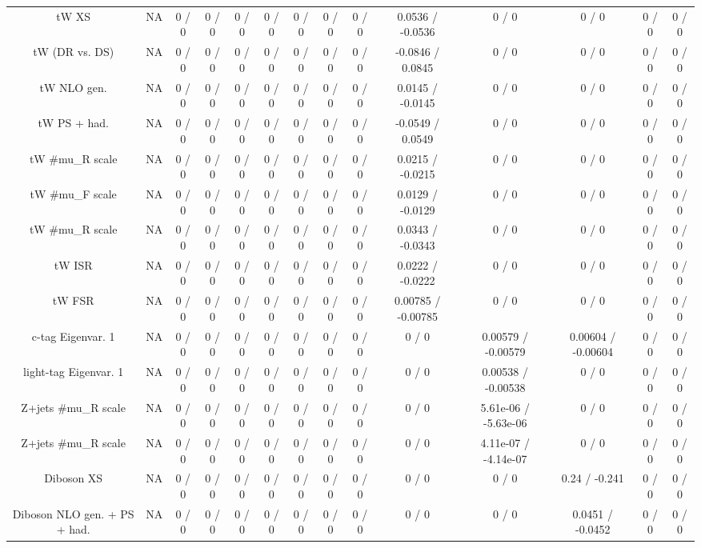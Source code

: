 \documentclass[10pt]{article}
\begin{document}
\begin{table}[htbp]
\begin{center}
\begin{tabular}{|c|c|c|c|c|c|c|c|c|c|c|c|c|c|}
  tW XS &    NA    & 0 / 0 & 0 / 0 & 0 / 0 & 0 / 0 & 0 / 0 & 0 / 0 & 0 / 0 & 0.0536 / -0.0536 & 0 / 0 & 0 / 0 & 0 / 0 & 0 / 0 \\ 
  tW (DR vs. DS) &    NA    & 0 / 0 & 0 / 0 & 0 / 0 & 0 / 0 & 0 / 0 & 0 / 0 & 0 / 0 & -0.0846 / 0.0845 & 0 / 0 & 0 / 0 & 0 / 0 & 0 / 0 \\ 
  tW NLO gen. &    NA    & 0 / 0 & 0 / 0 & 0 / 0 & 0 / 0 & 0 / 0 & 0 / 0 & 0 / 0 & 0.0145 / -0.0145 & 0 / 0 & 0 / 0 & 0 / 0 & 0 / 0 \\ 
  tW PS + had. &    NA    & 0 / 0 & 0 / 0 & 0 / 0 & 0 / 0 & 0 / 0 & 0 / 0 & 0 / 0 & -0.0549 / 0.0549 & 0 / 0 & 0 / 0 & 0 / 0 & 0 / 0 \\ 
  tW #mu_{R} scale &    NA    & 0 / 0 & 0 / 0 & 0 / 0 & 0 / 0 & 0 / 0 & 0 / 0 & 0 / 0 & 0.0215 / -0.0215 & 0 / 0 & 0 / 0 & 0 / 0 & 0 / 0 \\ 
  tW #mu_{F} scale &    NA    & 0 / 0 & 0 / 0 & 0 / 0 & 0 / 0 & 0 / 0 & 0 / 0 & 0 / 0 & 0.0129 / -0.0129 & 0 / 0 & 0 / 0 & 0 / 0 & 0 / 0 \\ 
  tW #mu_{R} scale &    NA    & 0 / 0 & 0 / 0 & 0 / 0 & 0 / 0 & 0 / 0 & 0 / 0 & 0 / 0 & 0.0343 / -0.0343 & 0 / 0 & 0 / 0 & 0 / 0 & 0 / 0 \\ 
  tW ISR &    NA    & 0 / 0 & 0 / 0 & 0 / 0 & 0 / 0 & 0 / 0 & 0 / 0 & 0 / 0 & 0.0222 / -0.0222 & 0 / 0 & 0 / 0 & 0 / 0 & 0 / 0 \\ 
  tW FSR &    NA    & 0 / 0 & 0 / 0 & 0 / 0 & 0 / 0 & 0 / 0 & 0 / 0 & 0 / 0 & 0.00785 / -0.00785 & 0 / 0 & 0 / 0 & 0 / 0 & 0 / 0 \\ 
  c-tag Eigenvar. 1 &    NA    & 0 / 0 & 0 / 0 & 0 / 0 & 0 / 0 & 0 / 0 & 0 / 0 & 0 / 0 & 0 / 0 & 0.00579 / -0.00579 & 0.00604 / -0.00604 & 0 / 0 & 0 / 0 \\ 
  light-tag Eigenvar. 1 &    NA    & 0 / 0 & 0 / 0 & 0 / 0 & 0 / 0 & 0 / 0 & 0 / 0 & 0 / 0 & 0 / 0 & 0.00538 / -0.00538 & 0 / 0 & 0 / 0 & 0 / 0 \\ 
  Z+jets #mu_{R} scale &    NA    & 0 / 0 & 0 / 0 & 0 / 0 & 0 / 0 & 0 / 0 & 0 / 0 & 0 / 0 & 0 / 0 & 5.61e-06 / -5.63e-06 & 0 / 0 & 0 / 0 & 0 / 0 \\ 
  Z+jets #mu_{R} scale &    NA    & 0 / 0 & 0 / 0 & 0 / 0 & 0 / 0 & 0 / 0 & 0 / 0 & 0 / 0 & 0 / 0 & 4.11e-07 / -4.14e-07 & 0 / 0 & 0 / 0 & 0 / 0 \\ 
  Diboson XS &    NA    & 0 / 0 & 0 / 0 & 0 / 0 & 0 / 0 & 0 / 0 & 0 / 0 & 0 / 0 & 0 / 0 & 0 / 0 & 0.24 / -0.241 & 0 / 0 & 0 / 0 \\ 
  Diboson NLO gen. + PS + had. &    NA    & 0 / 0 & 0 / 0 & 0 / 0 & 0 / 0 & 0 / 0 & 0 / 0 & 0 / 0 & 0 / 0 & 0 / 0 & 0.0451 / -0.0452 & 0 / 0 & 0 / 0 \\ 

\end{tabular}
\end{center}
\end{table}
\end{document}
